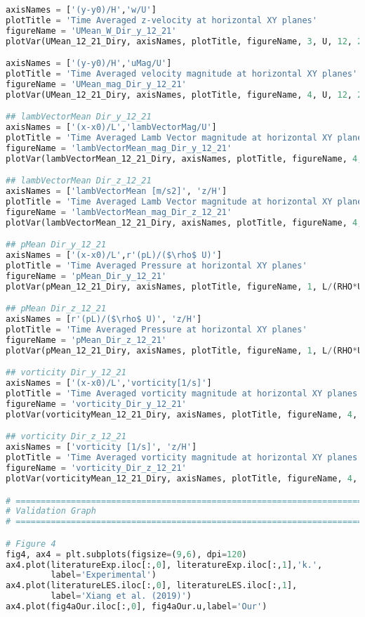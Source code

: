 \begin{lstlisting}[language=python]
axisNames = ['(y-y0)/H','w/U']
plotTitle = 'Time Averaged z-velocity at horizontal XY planes'
figureName = 'UMean_W_Dir_y_12_21'
plotVar(UMean_12_21_Diry, axisNames, plotTitle, figureName, 3, U, 12, 21)

axisNames = ['(y-y0)/H','uMag/U']
plotTitle = 'Time Averaged velocity magnitude at horizontal XY planes'
figureName = 'UMean_mag_Dir_y_12_21'
plotVar(UMean_12_21_Diry, axisNames, plotTitle, figureName, 4, U, 12, 21)

## lambVectorMean Dir_y_12_21
axisNames = ['(x-x0)/L','lambVectorMag/U']
plotTitle = 'Time Averaged Lamb Vector magnitude at horizontal XY planes'
figureName = 'lambVectorMean_mag_Dir_y_12_21'
plotVar(lambVectorMean_12_21_Diry, axisNames, plotTitle, figureName, 4, 1, 12, 21)

## lambVectorMean Dir_z_12_21
axisNames = ['lambVectorMean [m/s2]', 'z/H']
plotTitle = 'Time Averaged Lamb Vector magnitude at horizontal XY planes'
figureName = 'lambVectorMean_mag_Dir_z_12_21'
plotVar(lambVectorMean_12_21_Diry, axisNames, plotTitle, figureName, 4, 1, 12, 21)

## pMean Dir_y_12_21
axisNames = ['(x-x0)/L',r'(pL)/($\rho$ U)']
plotTitle = 'Time Averaged Pressure at horizontal XY planes'
figureName = 'pMean_Dir_y_12_21'
plotVar(pMean_12_21_Diry, axisNames, plotTitle, figureName, 1, L/(RHO*U), 12, 21)

## pMean Dir_z_12_21
axisNames = [r'(pL)/($\rho$ U)', 'z/H']
plotTitle = 'Time Averaged Pressure at horizontal XY planes'
figureName = 'pMean_Dir_z_12_21'
plotVar(pMean_12_21_Diry, axisNames, plotTitle, figureName, 1, L/(RHO*U), 12, 21)

## vorticity Dir_y_12_21
axisNames = ['(x-x0)/L','vorticity[1/s]']
plotTitle = 'Time Averaged vorticity magnitude at horizontal XY planes'
figureName = 'vorticity_Dir_y_12_21'
plotVar(vorticityMean_12_21_Diry, axisNames, plotTitle, figureName, 4, 1, 12, 21)

## vorticity Dir_z_12_21
axisNames = ['vorticity [1/s]', 'z/H']
plotTitle = 'Time Averaged vorticity magnitude at horizontal XY planes'
figureName = 'vorticity_Dir_z_12_21'
plotVar(vorticityMean_12_21_Diry, axisNames, plotTitle, figureName, 4, 1, 12, 21)

# =============================================================================
# Validation Graph
# =============================================================================

# Figure 4
fig4, ax4 = plt.subplots(figsize=(9,6), dpi=120)
ax4.plot(literatureExp.iloc[:,0], literatureExp.iloc[:,1],'k.',
         label='Experimental')
ax4.plot(literatureLES.iloc[:,0], literatureLES.iloc[:,1],
         label='Xiang et al. (2019)')
ax4.plot(fig4aOur.iloc[:,0], fig4aOur.u,label='Our')


\end{lstlisting}
